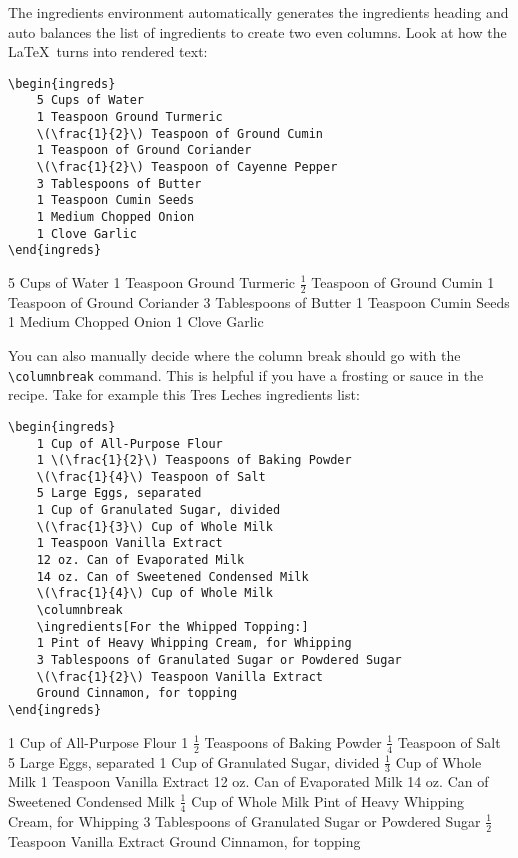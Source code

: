 \par The ingredients environment automatically generates the ingredients heading and auto balances the list of ingredients to create two even columns. Look at how the \LaTeX \ turns into rendered text:

\begin{verbatim}
\begin{ingreds}
    5 Cups of Water
    1 Teaspoon Ground Turmeric
    \(\frac{1}{2}\) Teaspoon of Ground Cumin
    1 Teaspoon of Ground Coriander
    \(\frac{1}{2}\) Teaspoon of Cayenne Pepper
    3 Tablespoons of Butter
    1 Teaspoon Cumin Seeds
    1 Medium Chopped Onion
    1 Clove Garlic
\end{ingreds}
\end{verbatim}

\begin{ingreds}
    5 Cups of Water
    1 Teaspoon Ground Turmeric
    \(\frac{1}{2}\) Teaspoon of Ground Cumin
    1 Teaspoon of Ground Coriander
    3 Tablespoons of Butter
    1 Teaspoon Cumin Seeds
    1 Medium Chopped Onion
    1 Clove Garlic
\end{ingreds}

\par You can also manually decide where the column break should go with the \verb|\columnbreak| command. This is helpful if you have a frosting or sauce in the recipe. Take for example this Tres Leches ingredients list:

\begin{verbatim}
\begin{ingreds}
    1 Cup of All-Purpose Flour
    1 \(\frac{1}{2}\) Teaspoons of Baking Powder
    \(\frac{1}{4}\) Teaspoon of Salt
    5 Large Eggs, separated
    1 Cup of Granulated Sugar, divided
    \(\frac{1}{3}\) Cup of Whole Milk
    1 Teaspoon Vanilla Extract
    12 oz. Can of Evaporated Milk
    14 oz. Can of Sweetened Condensed Milk
    \(\frac{1}{4}\) Cup of Whole Milk
    \columnbreak
    \ingredients[For the Whipped Topping:]
    1 Pint of Heavy Whipping Cream, for Whipping
    3 Tablespoons of Granulated Sugar or Powdered Sugar
    \(\frac{1}{2}\) Teaspoon Vanilla Extract
    Ground Cinnamon, for topping
\end{ingreds}
\end{verbatim}

\begin{ingreds}
    1 Cup of All-Purpose Flour
    1 \(\frac{1}{2}\) Teaspoons of Baking Powder
    \(\frac{1}{4}\) Teaspoon of Salt
    5 Large Eggs, separated
    1 Cup of Granulated Sugar, divided
    \(\frac{1}{3}\) Cup of Whole Milk
    1 Teaspoon Vanilla Extract
    12 oz. Can of Evaporated Milk
    14 oz. Can of Sweetened Condensed Milk
    \(\frac{1}{4}\) Cup of Whole Milk
    \columnbreak
     Pint of Heavy Whipping Cream, for Whipping
    3 Tablespoons of Granulated Sugar or Powdered Sugar
    \(\frac{1}{2}\) Teaspoon Vanilla Extract
    Ground Cinnamon, for topping
\end{ingreds}

